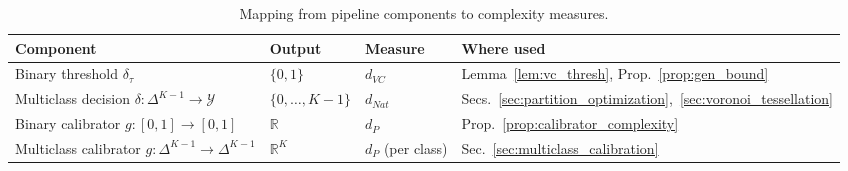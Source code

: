 \begin{table}[H]
    \centering\small
    \begin{tabular}{@{}p{4.4cm}lll@{}}
        \toprule
        \textbf{Component} & \textbf{Output} & \textbf{Measure} & \textbf{Where used} \\
        \midrule
        Binary threshold $\delta_\tau$ & $\{0,1\}$ & $d_{VC}$
            & Lemma~\ref{lem:vc_thresh}, Prop.~\ref{prop:gen_bound} \\
        Multiclass decision $\delta\colon \Delta^{K-1}\!\to\!\mathcal{Y}$ & $\{0,\ldots,K{-}1\}$ & $d_{Nat}$
            & Secs.~\ref{sec:partition_optimization},~\ref{sec:voronoi_tessellation} \\
        Binary calibrator $g\colon [0,1]\!\to\![0,1]$ & $\mathbb{R}$ & $d_P$
            & Prop.~\ref{prop:calibrator_complexity} \\
        Multiclass calibrator $g\colon \Delta^{K-1}\!\to\!\Delta^{K-1}$ & $\mathbb{R}^K$ & $d_P$ (per class)
            & Sec.~\ref{sec:multiclass_calibration} \\
        \bottomrule
    \end{tabular}
    \caption{Mapping from pipeline components to complexity measures.}\label{tab:complexity_unified}
\end{table}